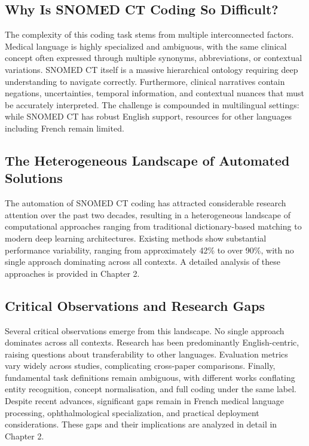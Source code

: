 \subsection{Why Is SNOMED CT Coding So Difficult?}

The complexity of this coding task stems from multiple interconnected factors. Medical language is highly specialized and ambiguous, with the same clinical concept often expressed through multiple synonyms, abbreviations, or contextual variations. SNOMED CT itself is a massive hierarchical ontology requiring deep understanding to navigate correctly. Furthermore, clinical narratives contain negations, uncertainties, temporal information, and contextual nuances that must be accurately interpreted. The challenge is compounded in multilingual settings: while SNOMED CT has robust English support, resources for other languages including French remain limited.

\subsection{The Heterogeneous Landscape of Automated Solutions}

The automation of SNOMED CT coding has attracted considerable research attention over the past two decades, resulting in a heterogeneous landscape of computational approaches ranging from traditional dictionary-based matching to modern deep learning architectures. Existing methods show substantial performance variability, ranging from approximately 42\% to over 90\%, with no single approach dominating across all contexts. A detailed analysis of these approaches is provided in Chapter 2.

\subsection{Critical Observations and Research Gaps}

Several critical observations emerge from this landscape. No single approach dominates across all contexts. Research has been predominantly English-centric, raising questions about transferability to other languages. Evaluation metrics vary widely across studies, complicating cross-paper comparisons. Finally, fundamental task definitions remain ambiguous, with different works conflating entity recognition, concept normalisation, and full coding under the same label. Despite recent advances, significant gaps remain in French medical language processing, ophthalmological specialization, and practical deployment considerations. These gaps and their implications are analyzed in detail in Chapter 2.

